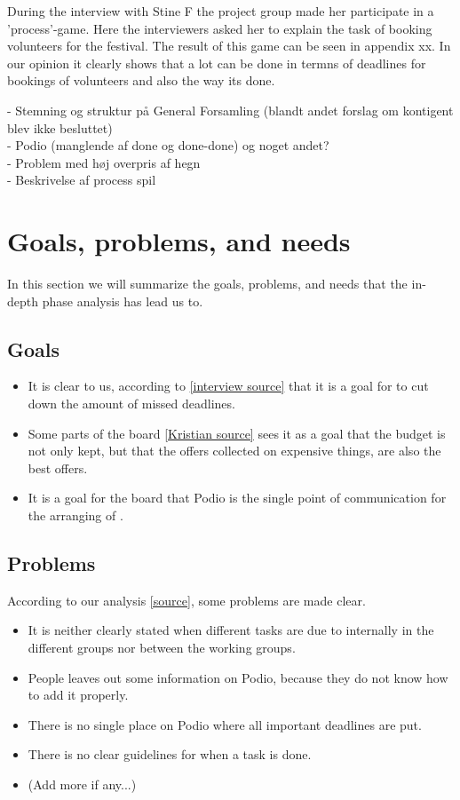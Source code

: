 During the interview with Stine F the project group made her participate in a 'process'-game. Here the interviewers asked her to explain the task of booking volunteers for the festival. The result of this game can be seen in appendix xx. In our opinion it clearly shows that a lot can be done in termns of deadlines for bookings of volunteers and also the way its done.

- Stemning og struktur på General Forsamling (blandt andet forslag om kontigent blev ikke besluttet)\\
- Podio (manglende af done og done-done) og noget andet?\\
- Problem med høj overpris af hegn\\
- Beskrivelse af process spil

\section{Goals, problems, and needs}
\label{sec:goprne}
In this section we will summarize the goals, problems, and needs that the
in-depth phase analysis has lead us to.

\subsection{Goals}
\label{subsec:goals}
\begin{itemize}
    \item It is clear to us, according to \ref{interview source} that it is a goal for \mil  to cut down
    the amount of missed deadlines.
    \item Some parts of the board \ref{Kristian source} sees it as a goal that the
    budget is not only kept, but that the offers collected on expensive things, are
    also the best offers.
    \item It is a goal for the board that Podio is the single point of communication
    for the arranging of \mil.
\end{itemize}

\subsection{Problems}
\label{subsec:problems}
According to our analysis \ref{source}, some problems are made clear.
\begin{itemize}
    \item It is neither clearly stated when different tasks are due to
    internally in the different groups nor between the working groups.
    \item People leaves out some information on Podio, because they do not know
    how to add it properly.
    \item There is no single place on Podio where all important deadlines are
    put.
    \item There is no clear guidelines for when a task is done.
    \item (Add more if any...)
\end{itemize}

